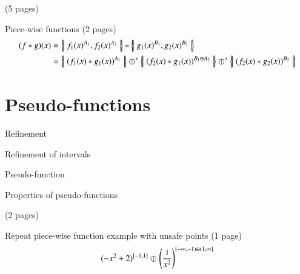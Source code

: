 (5 pages)

\begin{example}{Piece-wise functions} (2 pages)
\begin{align*}
(f * g) (x) &= \hset[ f_1(x)^{A_1} , f_2(x)^{A_2}] * \hset[g_1(x)^{B_1} , g_2(x)^{B_2}] \\
 &= \hset[(f_1(x)*g_1(x))^{A_1}] \hjoin[*] \hset[(f_2(x)*g_1(x))^{B_1 \ominus A_2}] \hjoin[*] \hset[(f_2(x) * g_2(x))^{B_2}]
\end{align*}
\end{example}

\newpage \addtocounter{page}{6}

\section{Pseudo-functions}
\begin{definition}
Refinement
\end{definition}

\begin{example}
Refinement of intervals
\end{example}

\begin{definition}
Pseudo-function
\end{definition}

Properties of pseudo-functions

(2 pages)

\begin{example}
Repeat piece-wise function example with unsafe points (1 page)
\begin{equation}
(-x^2+2)^{[-1,1]} \hjoin[] \left( \frac{1}{x^2} \right)^{[-\infty, -1) \oplus (1, \infty]}
\end{equation}
\end{example}

\newpage \addtocounter{page}{2}